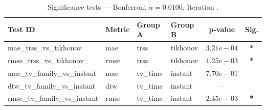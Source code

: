 ﻿%
\begin{table}[ht]
\centering
\caption[EEG reconstruction - Iteration it06b]{Significance tests — Bonferroni $\alpha=0.0100$. Iteration .}
\label{tab:sig_it06b_kalofolias_nnk_3syn}
\small
\begin{tabular}{llllcc}
\toprule
Test ID & Metric & Group A & Group B & p-value & Sig. \\
\midrule
mae\_trss\_vs\_tikhonov & mae & trss & tikhonov & $3.21e-04$ & \textbf{*} \\
rmse\_trss\_vs\_tikhonov & rmse & trss & tikhonov & $1.25e-03$ & \textbf{*} \\
mae\_tv\_family\_vs\_instant & mae & tv\_time & instant & $7.70e-01$ &  \\
dtw\_tv\_family\_vs\_instant & dtw & tv\_time & instant & -- &  \\
rmse\_tv\_family\_vs\_instant & rmse & tv\_time & instant & $2.45e-03$ & \textbf{*} \\
\bottomrule
\end{tabular}
\end{table}







